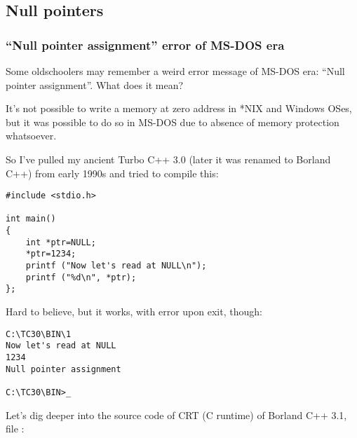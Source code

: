 \subsection{Null pointers}

\subsubsection{``Null pointer assignment'' error of MS-DOS era}

Some oldschoolers may remember a weird error message of MS-DOS era: ``Null pointer assignment''.
What does it mean?

It's not possible to write a memory at zero address in *NIX and Windows OSes, but it was possible to do so in MS-DOS due to absence of memory protection whatsoever.

So I've pulled my ancient Turbo C++ 3.0 (later it was renamed to Borland C++) from early 1990s and tried to compile this:

\begin{lstlisting}
#include <stdio.h>

int main()
{
	int *ptr=NULL;
	*ptr=1234;
	printf ("Now let's read at NULL\n");
	printf ("%d\n", *ptr);
};
\end{lstlisting}

Hard to believe, but it works, with error upon exit, though:

\begin{lstlisting}[caption=Ancient Turbo C 3.0]
C:\TC30\BIN\1
Now let's read at NULL
1234
Null pointer assignment

C:\TC30\BIN>_
\end{lstlisting}

Let's dig deeper into the source code of \ac{CRT} (C runtime) of Borland C++ 3.1, file :

